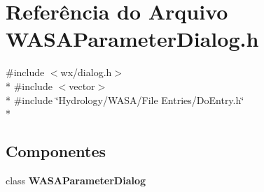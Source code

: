 \section{Referência do Arquivo W\+A\+S\+A\+Parameter\+Dialog.\+h}
\label{_w_a_s_a_parameter_dialog_8h}
{\ttfamily \#include $<$wx/dialog.\+h$>$}\\*
{\ttfamily \#include $<$vector$>$}\\*
{\ttfamily \#include \char`\"{}Hydrology/\+W\+A\+S\+A/\+File Entries/\+Do\+Entry.\+h\char`\"{}}\\*
\subsection*{Componentes}
\begin{DoxyCompactItemize}
\item 
class {\bf W\+A\+S\+A\+Parameter\+Dialog}
\end{DoxyCompactItemize}

